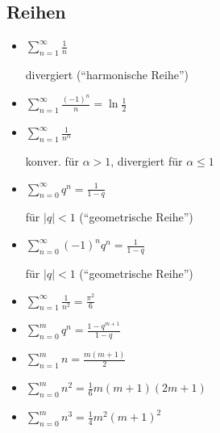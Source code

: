\subsection{Reihen}
\begin{itemize}[leftmargin=*]
	\item
	\begin{minipage}{0.35\columnwidth}
		$\sum_{n=1}^\infty \frac{1}{n}$
	\end{minipage}
	\begin{minipage}{0.60\columnwidth}
		divergiert (``harmonische Reihe'')
	\end{minipage}

	\item $\sum_{n=1}^\infty \frac{(-1)^n}{n} = \ln \frac{1}{2}$
	\item 
	\begin{minipage}{0.35\columnwidth}
		$\sum_{n=1}^\infty \frac{1}{n^\alpha}$
	\end{minipage}
	\begin{minipage}{0.60\columnwidth}
		konver. für $\alpha > 1$, divergiert für $\alpha \leq 1$
	\end{minipage}
	 
	\item 
	\begin{minipage}{0.35\columnwidth}
		$\sum_{n=0}^\infty q^n = \frac{1}{1-q}$
	\end{minipage}
	\begin{minipage}{0.60\columnwidth}
		für $|q| < 1$ (``geometrische Reihe'')
	\end{minipage}
	
	\item
	\begin{minipage}{0.35\columnwidth}
		$\sum_{n=0}^\infty (-1)^n q^n = \frac{1}{1-q}$
	\end{minipage}
	\begin{minipage}{0.60\columnwidth}
		für $|q| < 1$ (``geometrische Reihe'')
	\end{minipage}

	\item $\sum_{n=1}^\infty \frac{1}{n^2} = \frac{\pi^2}{6}$
	\newline
	\item $\sum_{n=0}^m q^n = \frac{1-q^{m+1}}{1-q}$ 
	\item $\sum_{n=1}^m n = \frac{m(m+1)}{2}$
	\item  $\sum_{n=0}^m n^2 = \frac{1}{6}m(m+1)(2m+1)$
	\item  $\sum_{n=0}^m n^3 = \frac{1}{4}m^2(m+1)^2$
\end{itemize}

